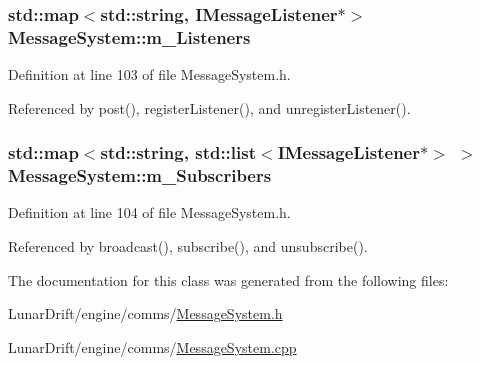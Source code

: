\subsubsection[{\texorpdfstring{m\+\_\+\+Listeners}{m_Listeners}}]{\setlength{\rightskip}{0pt plus 5cm}std\+::map$<$std\+::string, {\bf I\+Message\+Listener}$\ast$$>$ Message\+System\+::m\+\_\+\+Listeners\hspace{0.3cm}{\ttfamily [private]}}\hypertarget{class_message_system_ab4b90cfd3e6e27a6ae7417ecf17123d7}{}\label{class_message_system_ab4b90cfd3e6e27a6ae7417ecf17123d7}


Definition at line 103 of file Message\+System.\+h.



Referenced by post(), register\+Listener(), and unregister\+Listener().

\subsubsection[{\texorpdfstring{m\+\_\+\+Subscribers}{m_Subscribers}}]{\setlength{\rightskip}{0pt plus 5cm}std\+::map$<$std\+::string, std\+::list$<${\bf I\+Message\+Listener}$\ast$$>$ $>$ Message\+System\+::m\+\_\+\+Subscribers\hspace{0.3cm}{\ttfamily [private]}}\hypertarget{class_message_system_a64730035cb0e435bd3b1ff4c1c8dfe20}{}\label{class_message_system_a64730035cb0e435bd3b1ff4c1c8dfe20}


Definition at line 104 of file Message\+System.\+h.



Referenced by broadcast(), subscribe(), and unsubscribe().



The documentation for this class was generated from the following files\+:\begin{DoxyCompactItemize}
\item 
Lunar\+Drift/engine/comms/\hyperlink{_message_system_8h}{Message\+System.\+h}\item 
Lunar\+Drift/engine/comms/\hyperlink{_message_system_8cpp}{Message\+System.\+cpp}\end{DoxyCompactItemize}
